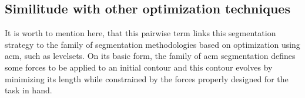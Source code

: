 \subsection{Similitude with other optimization techniques}
It is worth to mention here, that this pairwise term links this segmentation strategy to the family of segmentation methodologies based on optimization using \ac{acm}, such as levelsets.
On its basic form, the family of \ac{acm} segmentation defines some forces to be applied to an initial contour and this contour evolves by minimizing its length while constrained by the forces properly designed for the task in hand.

%
%
%
%

